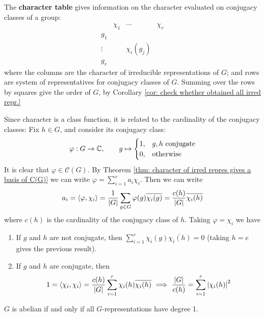 \documentclass{article}
\begin{document}
\begin{notation}
    The \textbf{character table} gives information on the character evaluated on conjugacy classes of a group:
    \[
        \begin{array}{c|ccc}
            & \chi_1 & \cdots & \chi_r \\
            \hline
            g_1 & & & \\
            \vdots & & \chi_i(g_j) & \\
            g_r & & &
        \end{array}
    \]
    where the columns are the character of irreducible representations of $G$; and rows are system of representatives for conjugacy classes of $G$. Summing over the rows by squares give the order of $G$, by Corollary \ref{cor: check whether obtained all irred repr.}
\end{notation}

Since character is a class function, it is related to the cardinality of the conjugacy classes: Fix $h \in G$, and consider its conjugacy class:
\[
    \varphi: G \to \mathbb{C}, \qquad g \mapsto 
    \begin{cases}
        1, & g, h \text{ conjugate} \\
        0, & \text{otherwise}
    \end{cases}
\]
It is clear that $\varphi \in \mathcal{C}(G)$. By Theorem \ref{thm: character of irred repres gives a basis of C(G)} we can write $\varphi = \sum_{i = 1}^r a_i \chi_i$. Then we can write
\[
    a_i = \left\langle \varphi, \chi_i \right\rangle = \frac{1}{\left|G\right|} \sum_{g \in G} \varphi(g) \overline{\chi_i(g)} = \frac{c(h)}{\left|G\right|} \overline{\chi_i(h)}
\]
where $c(h)$ is the cardinality of the conjugacy class of $h$. Taking $\varphi = \chi_i$ we have
\begin{enumerate}[label=\arabic*)]
    \item If $g$ and $h$ are not conjugate, then $\sum_{i = 1}^r \chi_i(g) \overline{\chi_i(h)} = 0$ (taking $h = e$ gives the previous result).
    \item If $g$ and $h$ are conjugate, then
    \[
        1 = \left\langle \chi_i, \chi_i \right\rangle = \frac{c(h)}{\left|G\right|} \sum_{i = 1}^r \chi_i(h) \overline{\chi_i(h)} \ \Longrightarrow\  \frac{\left|G\right|}{c(h)} = \sum_{i = 1}^r \left|\chi_i(h)\right|^2
    \]
\end{enumerate}

\begin{proposition}
    $G$ is abelian if and only if all $G$-representations have degree 1.
\end{proposition}
\end{document}
